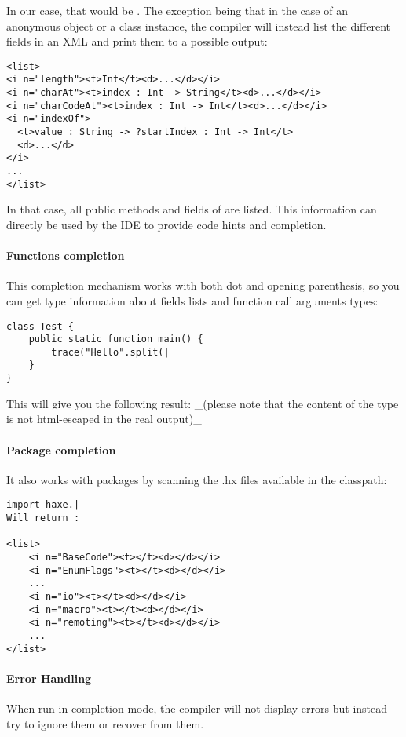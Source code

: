 In our case, that would be . The exception being that in the case of an anonymous object or a class instance, the compiler will instead list the different fields in an XML and print them to a possible output:

\begin{lstlisting}
<list>
<i n="length"><t>Int</t><d>...</d></i>
<i n="charAt"><t>index : Int -> String</t><d>...</d></i>
<i n="charCodeAt"><t>index : Int -> Int</t><d>...</d></i>
<i n="indexOf">
  <t>value : String -> ?startIndex : Int -> Int</t>
  <d>...</d>
</i>
...
</list>
\end{lstlisting}

In that case, all public methods and fields of  are listed. This information can directly be used by the IDE to provide code hints and completion.

\paragraph{Functions completion}
This completion mechanism works with both dot and opening parenthesis, so you can get type information about fields lists and function call arguments types:

\begin{lstlisting}
class Test {
    public static function main() {
        trace("Hello".split(|
    }
}
\end{lstlisting}

This will give you the following result:  \_(please note that the content of the type is not html-escaped in the real output)\_

\paragraph{Package completion}
It also works with packages by scanning the .hx files available in the classpath:

\begin{lstlisting}
import haxe.|
Will return :

<list>
    <i n="BaseCode"><t></t><d></d></i>
    <i n="EnumFlags"><t></t><d></d></i>
    ...
    <i n="io"><t></t><d></d></i>
    <i n="macro"><t></t><d></d></i>
    <i n="remoting"><t></t><d></d></i>
    ...
</list>
\end{lstlisting}

\paragraph{Error Handling}
When run in completion mode, the compiler will not display errors but instead try to ignore them or recover from them. 

